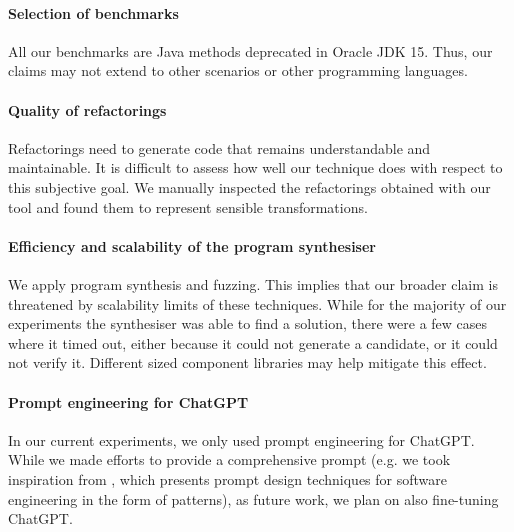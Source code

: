 \documentclass[10pt,conference]{IEEEtran}
\begin{document}
\paragraph{Selection of benchmarks}
All our benchmarks are Java methods deprecated in Oracle JDK 15. %
Thus, our claims may not extend to other scenarios or other programming languages.

\paragraph{Quality of refactorings} Refactorings need to generate code that
remains understandable and maintainable. It is difficult to assess how well our technique does with respect to
this subjective goal.  %
We manually inspected the refactorings obtained with
our tool and found them to represent sensible transformations.

\paragraph{Efficiency and scalability of the program synthesiser}
We apply program synthesis and fuzzing. 
This implies that our broader claim is threatened by scalability limits of these techniques.
While for the majority of our experiments the synthesiser was able to find a solution, there were a few cases
where it timed out, either because it could not generate a candidate, or it could not verify it.
Different sized component libraries may help mitigate this effect.

\paragraph{Prompt engineering for ChatGPT}
In our current experiments, we only used prompt engineering for ChatGPT.
While we made efforts to provide a comprehensive prompt (e.g. we took inspiration from \cite{white2023chatgpt}, which
presents prompt design techniques for software engineering in the form of patterns), as future work, we plan on also fine-tuning ChatGPT. 
\end{document}
